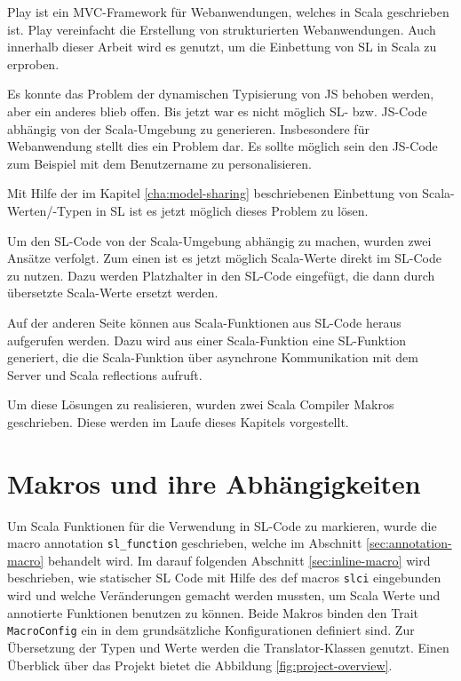 \documentclass[12pt,bibtotoc]{scrreprt}
\begin{document}
Play ist ein \ac{MVC}-Framework für Webanwendungen, welches in Scala geschrieben ist. Play vereinfacht die Erstellung von strukturierten Webanwendungen. Auch innerhalb dieser Arbeit wird es genutzt, um die Einbettung von SL in Scala zu erproben.

Es konnte das Problem der dynamischen Typisierung von JS behoben werden, aber ein anderes blieb offen. Bis jetzt war es nicht möglich SL- bzw. JS-Code abhängig von der Scala-Umgebung zu generieren. Insbesondere für Webanwendung stellt dies ein Problem dar. Es sollte möglich sein den JS-Code zum Beispiel mit dem Benutzername zu personalisieren. 

Mit Hilfe der im Kapitel \ref{cha:model-sharing} beschriebenen Einbettung von Scala-Werten/-Typen in SL ist es jetzt möglich dieses Problem zu lösen.

Um den SL-Code von der Scala-Umgebung abhängig zu machen, wurden zwei Ansätze verfolgt. Zum einen ist es jetzt möglich Scala-Werte direkt im SL-Code zu nutzen. Dazu werden Platzhalter in den SL-Code eingefügt, die dann durch übersetzte Scala-Werte ersetzt werden.

Auf der anderen Seite können aus Scala-Funktionen aus SL-Code heraus aufgerufen werden. Dazu wird aus einer Scala-Funktion eine SL-Funktion generiert, die die Scala-Funktion über asynchrone Kommunikation mit dem Server und Scala reflections aufruft.

Um diese Lösungen zu realisieren, wurden zwei Scala Compiler Makros geschrieben. Diese werden im Laufe dieses Kapitels vorgestellt.

\section{Makros und ihre Abhängigkeiten}
\label{sec:project-structure}

Um Scala Funktionen für die Verwendung in \ac{SL}-Code zu markieren, wurde die macro annotation \lstinline!sl_function! geschrieben, welche im Abschnitt \ref{sec:annotation-macro} behandelt wird. Im darauf folgenden Abschnitt \ref{sec:inline-macro} wird beschrieben, wie statischer \ac{SL} Code mit Hilfe des def macros \lstinline!slci! eingebunden wird und welche Veränderungen gemacht werden mussten, um Scala Werte und annotierte Funktionen benutzen zu können. Beide Makros binden den Trait \lstinline!MacroConfig! ein in dem grundsätzliche Konfigurationen definiert sind. Zur Übersetzung der Typen und Werte werden die Translator-Klassen genutzt. Einen Überblick über das Projekt bietet die Abbildung \ref{fig:project-overview}.
\end{document}
